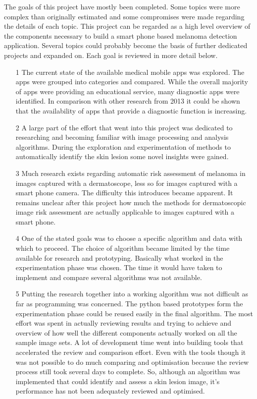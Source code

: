 The goals of this project have mostly been completed. Some topics were more complex than originally estimated and some compromises were made regarding the details of each topic. This project can be regarded as a high level overview of the components necessary to build a smart phone based melanoma detection application. Several topics could probably become the basis of further dedicated projects and expanded on. Each goal is reviewed in more detail below.

\noindent
\begin{itemize}
\item[1] The current state of the available medical mobile apps was explored. The apps were grouped into categories and compared. While the overall majority of apps were providing an educational service, many diagnostic apps were identified. In comparison with other research from 2013 it could be shown that the availability of apps that provide a diagnostic function is increasing.

\item[2] A large part of the effort that went into this project was dedicated to researching and becoming familiar with image processing and analysis algorithms. During the exploration and experimentation of methods to automatically identify the skin lesion some novel insights were gained.

\item[3] Much research exists regarding automatic risk assessment of melanoma in images captured with a dermatoscope, less so for images captured with a smart phone camera. The difficulty this introduces became apparent. It remains unclear after this project how much the methods for dermatoscopic image risk assessment are actually applicable to images captured with a smart phone.

\item[4] One of the stated goals was to choose a specific algorithm and data with which to proceed. The choice of algorithm became limited by the time available for research and prototyping. Basically what worked in the experimentation phase was chosen. The time it would have taken to implement and compare several algorithms was not available.

\item[5] Putting the research together into a working algorithm was not difficult as far as programming was concerned. The python based prototypes form the experimentation phase could be reused easily in the final algorithm. The most effort was spent in actually reviewing results and trying to achieve and overview of how well the different components actually worked on all the sample image sets. A lot of development time went into building tools that accelerated the review and comparison effort. Even with the tools though it was not possible to do much comparing and optimisation because the review process still took several days to complete. So, although an algorithm was implemented that could identify and assess a skin lesion image, it’s performance has not been adequately reviewed and optimised.


\end{itemize}
